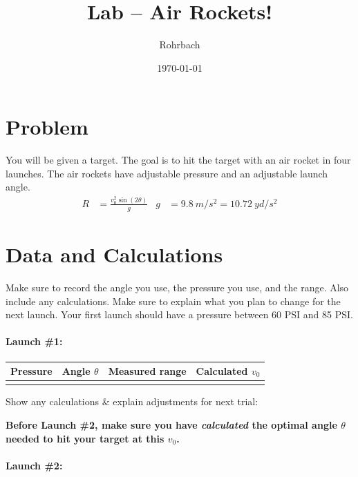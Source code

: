 \documentclass[10pt]{exam}
\title{Lab -- Air Rockets!}
\author{Rohrbach}
\date{\today}
\begin{document}
\maketitle

\section*{Problem} You will be given a target.  The goal is to hit the target with an air rocket in four launches. The air rockets have adjustable pressure and an adjustable launch angle.
%
\begin{align*}
  R &= \frac{v_0^2\sin\left(2\theta\right)}{g} &
  g &= \SI{9.8}{m/s^2} = \SI{10.72}{yd/s^2}
\end{align*}


\section*{Data and Calculations} Make sure to record the angle you use, the pressure you use, and the range.  Also include any calculations.  Make sure to explain what you plan to change for the next launch.  Your first launch should have a pressure between 60 PSI and 85 PSI.

\newcommand{\datatable}{
  \begin{tabular}{|c|c|c|c|}
    \hline
    Pressure & Angle $\theta$ & Measured range & Calculated $v_0$ \\\hline
            &                &                &                  \\[1em]
    \hline
  \end{tabular}
  
  \vspace{0.4em}

  
  {\small Show any calculations \& explain adjustments for next trial:}
}

\paragraph{Launch \#1:}\hfill

\datatable

\vs

{\footnotesize \bf Before Launch \#2, make sure you have \emph{calculated} the optimal angle $\theta$ needed to hit your target at this $v_0$.}




\paragraph{Launch \#2:}\hfill
\end{document}
